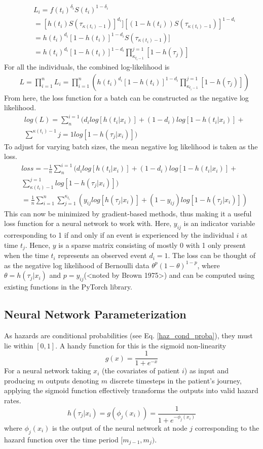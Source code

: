 \documentclass[%
 reprint,
 amsmath,amssymb,
 aps,
]{revtex4-2}
\begin{document}
\begin{align*}
&L_i = f(t_i)^{\delta_i}S(t_i)^{1-\delta_i}\\
&= [h(t_i)S(\tau_{\kappa(t_i)-1})]^{d_i}][(1-h(t_i))S(\tau_{\kappa(t_i)-1})]^{1-d_i}\\
&= h(t_i)^{d_i}[1 - h(t_i)]^{1-d_i}S(\tau_{\kappa(t_i)-1})]\\
&= h(t_i)^{d_i}[1 - h(t_i)]^{1-d_i} \prod^{j=1}_{\kappa_{t_i-1}}[1 - h(\tau_j)]
\end{align*}
For all the individuals, the combined log-likelihood is
\begin{align*}
&L = \prod^{n}_{i=1}L_i = \prod^{n}_{i=1}\left(h(t_i)^{d_i}[1 - h(t_i)]^{1-d_i} \prod^{j=1}_{\kappa_{t_i-1}}[1 - h(\tau_j)]\right)
\end{align*}
From here, the loss function for a batch can be constructed as the negative log likelihood.
\begin{align*}
&log(L) = \sum^{i=1}_{n}\Bigg(d_i log[h(t_i|x_i)]+(1-d_i)log[1-h(t_i|x_i)]+\\
&\sum^{\kappa(t_i)-1}{j=1}log[1 - h(\tau_j|x_i)] \Bigg)
\end{align*}
To adjust for varying batch sizes, the mean negative log likelihood is taken as the loss.
\begin{align*}
&loss = -\frac{1}{n}\sum^{i=1}_{n}\Bigg(d_i log[h(t_i|x_i)]+(1-d_i)log[1-h(t_i|x_i)]+\\
&\sum^{j=1}_{\kappa(t_i)-1}log[1 - h(\tau_j|x_i)] \Bigg) \\
&= \frac{1}{n}\sum^{n}_{i=1}\sum^{\kappa_{t_i}}_{j=1}(y_{ij}log[h(\tau_j|x_i)]+(1-y_{ij})log[1-h(\tau_j|x_i)])
\end{align*}
This can now be minimized by gradient-based methods, thus making it a useful loss function for a neural network to work with. Here, $y_{ij}$ is an indicator variable corresponding to 1 if and only if an event is experienced by the individual $i$ at time $t_j$. Hence, $y$ is a sparse matrix consisting of mostly 0 with 1 only present when the time $t_i$ represents an observed event $d_i = 1$. The loss can be thought of as the negative log likelihood of Bernoulli data $\theta^p(1-\theta)^{1-p}$, where $\theta=h(\tau_j|x_i)$ and $p=y_{ij}$(<noted by Brown 1975>) and can be computed using existing functions in the PyTorch library.\\

\subsection{\label{nn_param}Neural Network Parameterization}
As hazards are conditional probabilities (see Eq. \ref{haz_cond_proba}), they must lie within $[0,1]$. A handy function for this is the sigmoid non-linearity
\[
g(x) = \frac{1}{1+e^{-x}}
\]
For a neural network taking $x_i$ (the covariates of patient $i$) as input and producing $m$ outputs denoting $m$ discrete timesteps in the patient's journey, applying the sigmoid function effectively transforms the outputs into valid hazard rates.
\[
h(\tau_j|x_i) = g(\phi_j(x_i)) = \frac{1}{1+e^{-\phi_j(x_i)}}
\]
where $\phi_j(x_i)$ is the output of the neural network at node $j$ corresponding to the hazard function over the time period $[m_{j-1}, m_j)$.\\
\end{document}
